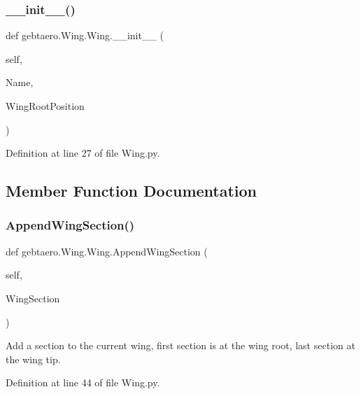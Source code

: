 \subsubsection{\texorpdfstring{\+\_\+\+\_\+init\+\_\+\+\_\+()}{\_\_init\_\_()}}
{\footnotesize\ttfamily def gebtaero.\+Wing.\+Wing.\+\_\+\+\_\+init\+\_\+\+\_\+ (\begin{DoxyParamCaption}\item[{}]{self,  }\item[{}]{Name,  }\item[{}]{Wing\+Root\+Position }\end{DoxyParamCaption})}



Definition at line 27 of file Wing.\+py.



\subsection{Member Function Documentation}
\mbox{\label{classgebtaero_1_1_wing_1_1_wing_ae2bcf197a55c10900d837bc0d9d6aac7}} 
\subsubsection{\texorpdfstring{Append\+Wing\+Section()}{AppendWingSection()}}
{\footnotesize\ttfamily def gebtaero.\+Wing.\+Wing.\+Append\+Wing\+Section (\begin{DoxyParamCaption}\item[{}]{self,  }\item[{}]{Wing\+Section }\end{DoxyParamCaption})}

\begin{DoxyVerb}Add a section to the current wing, first section is at the wing root, last section at the wing tip.
\end{DoxyVerb}
 

Definition at line 44 of file Wing.\+py.

\mbox{\label{classgebtaero_1_1_wing_1_1_wing_a15245b467e6be2a7ace9a917e67661ff}} 
